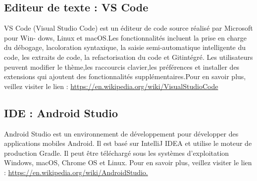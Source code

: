 \subsection{Editeur de texte : VS Code}

VS Code (Visual Studio Code) est un éditeur de code source réalisé par Microsoft pour Win-
dows, Linux et macOS.Les fonctionnalités incluent la prise en charge du débogage, lacoloration
syntaxique, la saisie semi-automatique intelligente du code, les extraits de code, la refactorisation du
code et Gitintégré. Les utilisateurs peuvent modifier le thème,les raccourcis clavier,les préférences et
installer des extensions qui ajoutent des fonctionnalités supplémentaires.\newline Pour en savoir plus, veillez
visiter le lien : \href{https://en.wikipedia.org/wiki/VisualStudioCode}{https://en.wikipedia.org/wiki/VisualStudioCode}
\subsection{IDE : Android Studio}

Android Studio est un environnement de développement pour développer des applications mobiles Android. Il est basé sur IntelliJ IDEA et utilise le moteur de production Gradle. Il peut être téléchargé sous les systèmes d'exploitation Windows, macOS, Chrome OS et Linux.
\newline Pour en savoir plus, veillez
visiter le lien : \href{https://en.wikipedia.org/wiki/AndroidStudio.}{https://en.wikipedia.org/wiki/AndroidStudio.}
